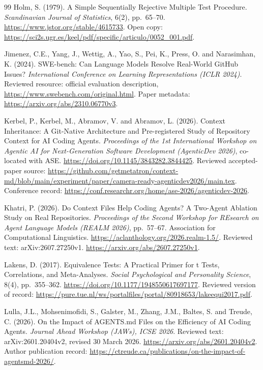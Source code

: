 \begin{thebibliography}{99}
Holm, S. (1979).
A Simple Sequentially Rejective Multiple Test Procedure.
\textit{Scandinavian Journal of Statistics}, 6(2), pp.~65--70.
\url{https://www.jstor.org/stable/4615733}.
Open copy: \url{https://sci2s.ugr.es/keel/pdf/specific/articulo/0052_001.pdf}.

Jimenez, C.E., Yang, J., Wettig, A., Yao, S., Pei, K., Press, O.
and Narasimhan, K. (2024).
SWE-bench: Can Language Models Resolve Real-World GitHub Issues?
\textit{International Conference on Learning Representations (ICLR 2024)}.
Reviewed resource: official evaluation description,
\url{https://www.swebench.com/original.html}.
Paper metadata: \url{https://arxiv.org/abs/2310.06770v3}.

Kerbel, P., Kerbel, M., Abramov, V. and Abramov, L. (2026).
Context Inheritance: A Git-Native Architecture and Pre-registered Study of
Repository Context for AI Coding Agents.
\textit{Proceedings of the 1st International Workshop on Agentic AI for
Next-Generation Software Development (AgenticDev 2026)}, co-located with ASE.
\url{https://doi.org/10.1145/3843282.3844425}.
Reviewed accepted-paper source: \url{https://github.com/getmetatron/context-md/blob/main/experiment/paper/camera-ready-agenticdev2026/main.tex}.
Conference record: \url{https://conf.researchr.org/home/ase-2026/agenticdev-2026}.

Khatri, P. (2026).
Do Context Files Help Coding Agents? A Two-Agent Ablation Study on Real Repositories.
\textit{Proceedings of the Second Workshop for REsearch on Agent Language Models
(REALM 2026)}, pp.~57--67. Association for Computational Linguistics.
\url{https://aclanthology.org/2026.realm-1.5/}.
Reviewed text: arXiv:2607.27250v1.
\url{https://arxiv.org/abs/2607.27250v1}.

Lakens, D. (2017).
Equivalence Tests: A Practical Primer for t Tests, Correlations, and Meta-Analyses.
\textit{Social Psychological and Personality Science}, 8(4), pp.~355--362.
\url{https://doi.org/10.1177/1948550617697177}.
Reviewed version of record:
\url{https://pure.tue.nl/ws/portalfiles/portal/80918653/lakeequi2017.pdf}.

Lulla, J.L., Mohsenimofidi, S., Galster, M., Zhang, J.M., Baltes, S.
and Treude, C. (2026).
On the Impact of AGENTS.md Files on the Efficiency of AI Coding Agents.
\textit{Journal Ahead Workshop (JAWs), ICSE 2026}.
Reviewed text: arXiv:2601.20404v2, revised 30 March 2026.
\url{https://arxiv.org/abs/2601.20404v2}.
Author publication record:
\url{https://ctreude.ca/publications/on-the-impact-of-agentsmd-2026/}.


\end{thebibliography}
